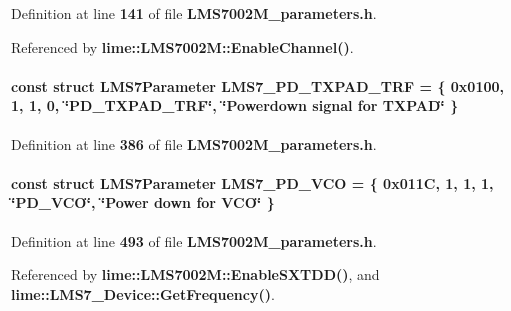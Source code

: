 Definition at line {\bf 141} of file {\bf L\+M\+S7002\+M\+\_\+parameters.\+h}.



Referenced by {\bf lime\+::\+L\+M\+S7002\+M\+::\+Enable\+Channel()}.

\paragraph[{L\+M\+S7\+\_\+\+P\+D\+\_\+\+T\+X\+P\+A\+D\+\_\+\+T\+RF}]{\setlength{\rightskip}{0pt plus 5cm}const struct {\bf L\+M\+S7\+Parameter} L\+M\+S7\+\_\+\+P\+D\+\_\+\+T\+X\+P\+A\+D\+\_\+\+T\+RF = \{ 0x0100, 1, 1, 0, \char`\"{}\+P\+D\+\_\+\+T\+X\+P\+A\+D\+\_\+\+T\+R\+F\char`\"{}, \char`\"{}\+Powerdown signal for T\+X\+P\+A\+D\char`\"{} \}\hspace{0.3cm}{\ttfamily [static]}}\label{LMS7002M__parameters_8h_a485db7cdab8c12b6c15172299acdd907}


Definition at line {\bf 386} of file {\bf L\+M\+S7002\+M\+\_\+parameters.\+h}.

\paragraph[{L\+M\+S7\+\_\+\+P\+D\+\_\+\+V\+CO}]{\setlength{\rightskip}{0pt plus 5cm}const struct {\bf L\+M\+S7\+Parameter} L\+M\+S7\+\_\+\+P\+D\+\_\+\+V\+CO = \{ 0x011\+C, 1, 1, 1, \char`\"{}\+P\+D\+\_\+\+V\+C\+O\char`\"{}, \char`\"{}\+Power down for V\+C\+O\char`\"{} \}\hspace{0.3cm}{\ttfamily [static]}}\label{LMS7002M__parameters_8h_ad35affced0e567a0ed1942c3d0afa3de}


Definition at line {\bf 493} of file {\bf L\+M\+S7002\+M\+\_\+parameters.\+h}.



Referenced by {\bf lime\+::\+L\+M\+S7002\+M\+::\+Enable\+S\+X\+T\+D\+D()}, and {\bf lime\+::\+L\+M\+S7\+\_\+\+Device\+::\+Get\+Frequency()}.

